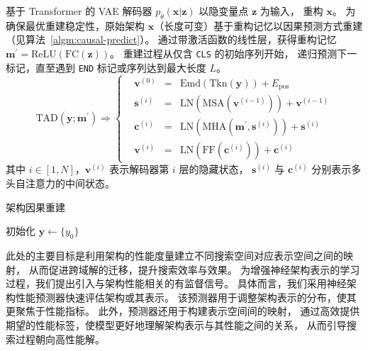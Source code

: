 \documentclass[../main.tex]{subfiles}
\begin{document}

基于 Transformer 的 VAE 解码器 $ p_{\theta}(\bm{x}|\bm{z}) $ 以隐变量点 $ \bm{z} $ 为输入，
重构 $ \bm{x} $。
为确保最优重建稳定性，原始架构 $ \bm{x} $（长度可变）基于重构记忆以因果预测方式重建（见算法~\ref{algm:causal-predict}）。
通过带激活函数的线性层，获得重构记忆 $ \bm{m}^\prime = \mathrm{ReLU}(\mathrm{FC}(\bm{z})) $。
重建过程从仅含 \texttt{CLS} 的初始序列开始，
递归预测下一标记，直至遇到 \texttt{END} 标记或序列达到最大长度 $ L $。
\begin{equation}
	\mathrm{TAD}(\bm{y};\bm{m}^\prime)\Rightarrow\left\{
	\begin{alignedat}{2}
		 & \bm{v}^{(0)} & = {} & \mathrm{Emd} (\mathrm{Tkn} (\bm{y})) + E_\mathrm{pos}                   \\
		 & \bm{s}^{(i)} & = {} & \mathrm{LN} (\mathrm{MSA} (\bm{v}^{(i-1)})) + \bm{v}^{(i-1)}            \\
		 & \bm{c}^{(i)} & = {} & \mathrm{LN} (\mathrm{MHA} (\bm{m}^\prime, \bm{s}^{(i)})) + \bm{s}^{(i)} \\
		 & \bm{v}^{(i)} & = {} & \mathrm{LN} (\mathrm{FF} (\bm{c}^{(i)})) + \bm{c}^{(i)}
	\end{alignedat}\right.
\end{equation}
其中 $ i \in [1,N] $，$ \bm{v}^{(i)} $ 表示解码器第 $ i $ 层的隐藏状态，
$ \bm{s}^{(i)} $ 与 $ \bm{c}^{(i)} $ 分别表示多头自注意力的中间状态。

\begin{algorithm}[t]
	\caption{架构因果重建}\label{algm:causal-predict}
	\SetAlgoLined{}
	\BlankLine
	初始化 $ \bm{y} \gets \{y_0\} $\;
	\BlankLine
	\BlankLine
	\;
\end{algorithm}


此处的主要目标是利用架构的性能度量建立不同搜索空间对应表示空间之间的映射，
从而促进跨域解的迁移，提升搜索效率与效果。
为增强神经架构表示的学习过程，我们提出引入与架构性能相关的有监督信号。
具体而言，我们采用神经架构性能预测器快速评估架构或其表示。
该预测器用于调整架构表示的分布，使其更聚焦于性能指标。
此外，预测器还用于构建表示空间间的映射，
通过高效提供期望的性能标签，使模型更好地理解架构表示与其性能之间的关系，
从而引导搜索过程朝向高性能解。
\end{document}
